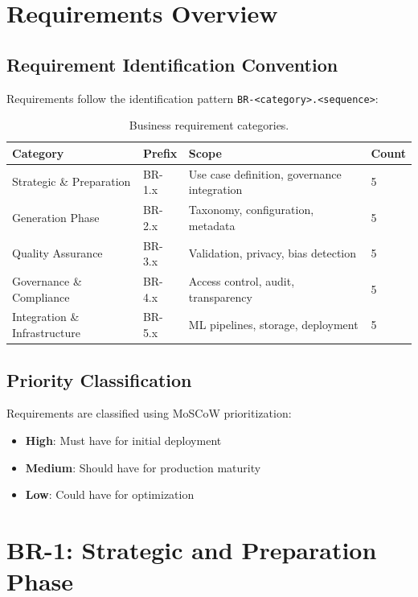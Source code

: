 \section{Requirements Overview}

\subsection{Requirement Identification Convention}

Requirements follow the identification pattern \texttt{BR-<category>.<sequence>}:

\begin{table}[htbp]
\centering
\caption{Business requirement categories.}
\label{tab:br-categories}
\footnotesize
\begin{tabularx}{\textwidth}{@{}l l X l@{}}
\toprule
\textbf{Category} & \textbf{Prefix} & \textbf{Scope} & \textbf{Count} \\
\midrule
Strategic \& Preparation & BR-1.x & Use case definition, governance integration & 5 \\
Generation Phase & BR-2.x & Taxonomy, configuration, metadata & 5 \\
Quality Assurance & BR-3.x & Validation, privacy, bias detection & 5 \\
Governance \& Compliance & BR-4.x & Access control, audit, transparency & 5 \\
Integration \& Infrastructure & BR-5.x & ML pipelines, storage, deployment & 5 \\
\bottomrule
\end{tabularx}
\end{table}

\subsection{Priority Classification}

Requirements are classified using MoSCoW prioritization:
\begin{itemize}
  \item \textbf{High}: Must have for initial deployment
  \item \textbf{Medium}: Should have for production maturity
  \item \textbf{Low}: Could have for optimization
\end{itemize}


\section{BR-1: Strategic and Preparation Phase}


